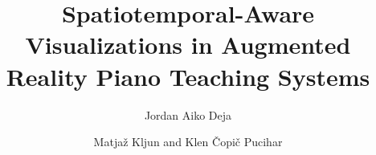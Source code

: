 \documentclass[manuscript,screen]{acmart}
\begin{document}
\title{Spatiotemporal-Aware Visualizations in Augmented Reality Piano Teaching Systems}

\author{Jordan Aiko Deja}

\author{Matjaž Kljun and Klen Čopič Pucihar}

\end{document}
